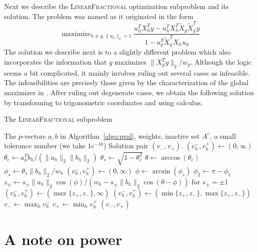 \documentclass{imsart}
\newcommand{\maximize}{\mathop{\mathrm{maximize}}}
\newcommand{\norm}[1]{\lVert #1 \rVert}
\begin{document}
Next we describe the \textsc{LinearFractional} optimization
subproblem and its solution.
The problem was named as it originated in the form
\[
\maximize_{h \neq g, \norm{u_h}_2 = 1}
\frac{u_h^TX_h^Ty - u_h^TX_h^T\tilde X_g \tilde X_g^Ty}
{1 - u_g^T \tilde X_g^TX_hu_h}
\]
The solution we describe next is to a slightly different problem which
also incorporates the information that $g$ maximizes $\norm{X_g^Ty}_2/w_g$.
Although the logic seems a bit complicated, it mainly involves ruling out
several cases as infeasible. The infeasibilities are precisely those given
by the characterization of the global maximizer in \cite{tests:adaptive}.
After ruling out degenerate cases, we obtain the following solution
by transforming to trigonometric coordinates and using calculus.

\begin{algorithm}
 \caption{The \textsc{LinearFractional} subproblem}
 \label{algo:linfrac}
 \begin{algorithmic}
   \REQUIRE The $p$-vectors $a, b$ in Algorithm~\ref{algo:pval}, weights, inactive set $A^c$, a small tolerance number
(we take $1e^{-10}$)
   \ENSURE Solution pair $(v_-, v_+)$.
     \IF{$\norm{b_h}_2 == 0$ or $\norm{a_h}_2/\norm{b_h}_2 < \text{tol}$}
       \STATE $(v^-_h, v^+_h) \gets (0, \infty)$
     \ELSE
       \STATE $\theta_c \gets a_h^Tb_h/(\norm{a_h}_2 \norm{b_h}_2)$
       \STATE $\theta_s \gets \sqrt{1-\theta_c^2}$
       \STATE $\theta \gets \arccos (\theta_c)$
       \STATE $\phi_s \gets \theta_s \norm{b_h}_2 / w_h$
         \STATE $(v^-_h, v^+_h) \gets (0, \infty)$
       \ELSE
         \STATE $\phi \gets \arcsin(\phi_s)$
         \STATE $\phi_2 \gets \pi - \phi_1$
         \STATE $z_\pm \gets s_\pm \norm{a_h}_2 \cos(\phi) /(w_h - s_\pm \norm{b_h}_2 \cos(\theta - \phi))$ for $s_\pm = \pm 1$
         \IF{$\norm{b_h}_2 < w_h$}
           \STATE $(v_h^-, v_h^+) \gets (\max \{ z_+, z_- \}, \infty)$
         \ELSE
           \STATE $(v_h^-, v_h^+) \gets (\min \{ z_+, z_- \}, \max \{ z_+, z_- \})$
         \ENDIF
       \ENDIF
     \ENDIF
   \ENDFOR
   \STATE $v_- \gets \max_h v_h^-$
   \STATE $v_+ \gets \min_h v_h^+$
   \RETURN $(v_-, v_+)$
 \end{algorithmic}
\end{algorithm}

\section{A note on power}
\label{app:power}
\end{document}
